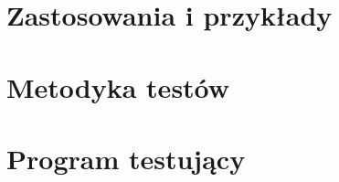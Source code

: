 \documentclass[12pt,a4paper,intlimits,oneside]{report}
\begin{document}
\chapter{Zastosowania i przykłady}


\appendix

\chapter{Metodyka testów}



\chapter{Program testujący}








\clearpage
{}
{}
\printindex
\end{document}
